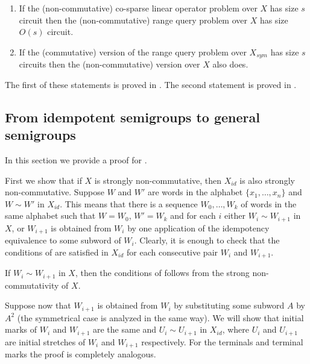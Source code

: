 \documentclass{toc}
\begin{document}
\begin{enumerate}
	\item If the (non-commutative)
    co-sparse
    linear operator problem over $X$ has size $s$
	circuit then the (non-commutative)
	range query
	problem over $X$ has size
	$O(s)$ circuit.
	\item If the (commutative) version of the
	range query
	problem over $X_{sym}$ has
	size $s$ circuits then the (non-commutative) version over $X$ also does.
\end{enumerate}

The first of these statements is proved in  .
The second statement is proved in .

\subsection{From idempotent semigroups to general semigroups}\label{sec:noncommutative_extension}

In this section we provide a proof for .


First we show that if $X$ is strongly non-commutative, then $X_{id}$ is also strongly non-commutative.
Suppose $W$ and $W'$ are words in the alphabet $\{x_1,\ldots, x_n\}$ and $W \sim W'$ in $X_{id}$. This means that there is a sequence $W_0,\ldots, W_k$ of words in the same alphabet such that $W=W_0$, $W'=W_k$ and for each $i$ either $W_i \sim W_{i+1}$ in $X$, or $W_{i+1}$ is obtained from $W_i$ by one application of the idempotency equivalence to some subword of $W_i$. Clearly, it is enough to check that the conditions of  are satisfied in $X_{id}$ for each consecutive pair $W_i$ and $W_{i+1}$.

If $W_i \sim W_{i+1}$ in $X$, then the conditions of  follows from the strong non-commutativity of $X$.

Suppose now that $W_{i+1}$ is obtained from $W_{i}$ by substituting some subword $A$ by $A^2$ (the symmetrical case is analyzed in the same way). We will show that initial marks of $W_i$ and $W_{i+1}$ are the same and $U_{i} \sim U_{i+1}$ in $X_{id}$, where $U_{i}$ and $U_{i+1}$ are 
initial stretches %
of $W_i$ and $W_{i+1}$ respectively. For the terminals and terminal marks the proof is completely analogous.
\end{document}
